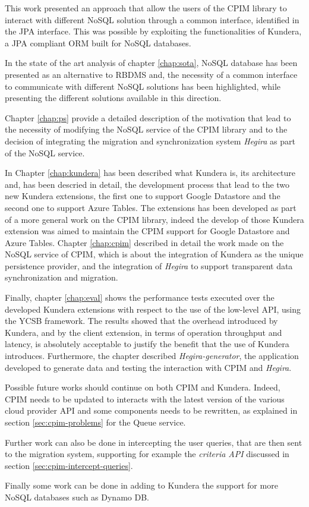 This work presented an approach that allow the users of the CPIM library to interact with different NoSQL solution through a common interface, identified in the JPA interface. This was possible by exploiting the functionalities of Kundera, a JPA compliant ORM built for NoSQL databases.

\noindent In the state of the art analysis of chapter \ref{chap:sota}, NoSQL database has been presented as an alternative to RBDMS and, the necessity of a common interface to communicate with different NoSQL solutions has been highlighted, while presenting the different solutions available in this direction.

\noindent Chapter \ref{chap:ps} provide a detailed description of the motivation that lead to the necessity of modifying the NoSQL service of the CPIM library and to the decision of integrating the migration and synchronization system \textit{Hegira} as part of the NoSQL service.

\noindent In Chapter \ref{chap:kundera} has been described what Kundera is, its architecture and, has been descried in detail, the development process that lead to the two new Kundera extensions, the first one to support Google Datastore and the second one to support Azure Tables. The extensions has been developed as part of a more general work on the CPIM library, indeed the develop of those Kundera extension was aimed to maintain the CPIM support for Google Datastore and Azure Tables. Chapter \ref{chap:cpim} described in detail the work made on the NoSQL service of CPIM, which is about the integration of Kundera as the unique persistence provider, and the integration of \textit{Hegira} to support transparent data synchronization and migration.

\noindent Finally, chapter \ref{chap:eval} shows the performance tests executed over the developed Kundera extensions with respect to the use of the low-level API, using the YCSB framework. The results showed that the overhead introduced by Kundera, and by the client extension, in terms of operation throughput and latency, is absolutely acceptable to justify the benefit that the use of Kundera introduces.
Furthermore, the chapter described \textit{Hegira-generator}, the application developed to generate data and testing the interaction with CPIM and \textit{Hegira}.

\newparagraph Possible future works should continue on both CPIM and Kundera. Indeed, CPIM needs to be updated to interacts with the latest version of the various cloud provider API and some components needs to be rewritten, as explained in section \ref{sec:cpim-problems} for the Queue service.

\noindent Further work can also be done in intercepting the user queries, that are then sent to the migration system, supporting for example the \textit{criteria API} discussed in section \ref{sec:cpim-intercept-queries}.

\noindent Finally some work can be done in adding to Kundera the support for more NoSQL databases such as Dynamo DB.
